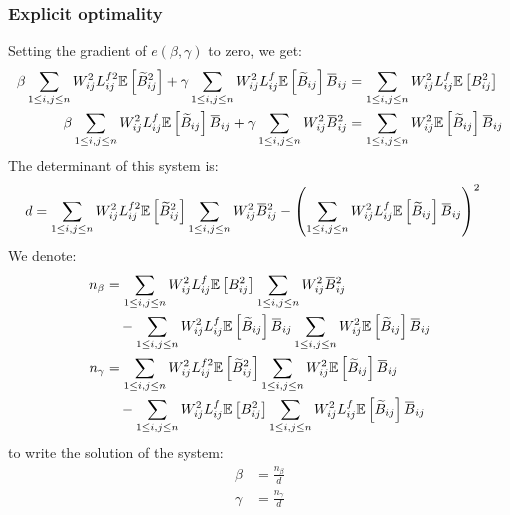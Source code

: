 \documentclass[12pt]{scrartcl}
\newcommand{\overbar}[1]{\mkern 1.5mu\overline{\mkern-1.5mu#1\mkern-1.5mu}\mkern 1.5mu}
\begin{document}
\subsubsection{Explicit optimality}
Setting the gradient of $e(\beta,\gamma)$ to zero, we get:
\begin{subequations}
\begin{align}
\beta \sum_{1 \le i,j \le n} W_{ij}^2 L^{f2}_{ij} \mathbb{E} \left[\widetilde{B}_{ij}^2\right] + \gamma \sum_{1 \le i,j \le n} W_{ij}^2 L^f_{ij} \mathbb{E} \left[\widetilde{B}_{ij}\right] \overbar{B}_{ij} & = \sum_{1 \le i,j \le n} W_{ij}^2  L^f_{ij} \mathbb{E} \left[B^2_{ij}\right] \\
\beta \sum_{1 \le i,j \le n} W_{ij}^2  L^f_{ij} \mathbb{E} \left[\widetilde{B}_{ij}\right] \overbar{B}_{ij} + \gamma \sum_{1 \le i,j \le n} W_{ij}^2 \overbar{B}_{ij}^2  & = \sum_{1 \le i,j \le n} W_{ij}^2  \mathbb{E} \left[\widetilde{B}_{ij}\right] \overbar{B}_{ij}
\end{align}
\end{subequations}
The determinant of this system is:
\begin{align}
d & = \sum_{1 \le i,j \le n} W_{ij}^2 L^{f2}_{ij} \mathbb{E} \left[\widetilde{B}_{ij}^2\right] \sum_{1 \le i,j \le n} W_{ij}^2 \overbar{B}_{ij}^2 - \left(\sum_{1 \le i,j \le n} W_{ij}^2 L^f_{ij} \mathbb{E} \left[\widetilde{B}_{ij}\right] \overbar{B}_{ij}\right)^2
\end{align}
We denote:
\begin{subequations}
\begin{align}
n_\beta & = \sum_{1 \le i,j \le n} W_{ij}^2  L^f_{ij} \mathbb{E} \left[B^2_{ij}\right] \sum_{1 \le i,j \le n} W_{ij}^2 \overbar{B}_{ij}^2 \nonumber \\
& \quad - \sum_{1 \le i,j \le n} W_{ij}^2 L^f_{ij} \mathbb{E} \left[\widetilde{B}_{ij}\right] \overbar{B}_{ij} \sum_{1 \le i,j \le n} W_{ij}^2  \mathbb{E} \left[\widetilde{B}_{ij}\right] \overbar{B}_{ij} \\
n_\gamma & = \sum_{1 \le i,j \le n} W_{ij}^2 L^{f2}_{ij} \mathbb{E} \left[\widetilde{B}_{ij}^2\right] \sum_{1 \le i,j \le n} W_{ij}^2  \mathbb{E} \left[\widetilde{B}_{ij}\right] \overbar{B}_{ij} \nonumber \\
& \quad - \sum_{1 \le i,j \le n} W_{ij}^2  L^f_{ij} \mathbb{E} \left[B^2_{ij}\right] \sum_{1 \le i,j \le n} W_{ij}^2  L^f_{ij} \mathbb{E} \left[\widetilde{B}_{ij}\right] \overbar{B}_{ij}
\end{align}
\end{subequations}
to write the solution of the system:
\begin{subequations}
\begin{align}
\beta & = \frac{n_\beta}{d} \\
\gamma & = \frac{n_\gamma}{d}
\end{align}
\end{subequations}
\end{document}
